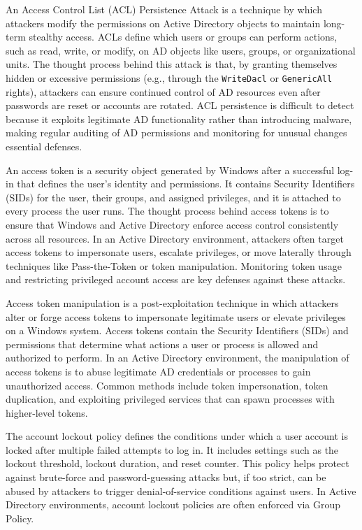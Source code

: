  An Access Control List (ACL) Persistence Attack is a technique by which attackers modify the permissions on Active Directory objects to maintain long-term stealthy access. ACLs define which users or groups can perform actions, such as read, write, or modify, on AD objects like users, groups, or organizational units. The thought process behind this attack is that, by granting themselves hidden or excessive permissions (e.g., through the \verb|WriteDacl| or \verb|GenericAll| rights), attackers can ensure continued control of AD resources even after passwords are reset or accounts are rotated. ACL persistence is difficult to detect because it exploits legitimate AD functionality rather than introducing malware, making regular auditing of AD permissions and monitoring for unusual changes essential defenses.

 An access token is a security object generated by Windows after a successful log-in that defines the user's identity and permissions. It contains Security Identifiers (SIDs) for the user, their groups, and assigned privileges, and it is attached to every process the user runs. The thought process behind access tokens is to ensure that Windows and Active Directory enforce access control consistently across all resources. In an Active Directory environment, attackers often target access tokens to impersonate users, escalate privileges, or move laterally through techniques like Pass-the-Token or token manipulation. Monitoring token usage and restricting privileged account access are key defenses against these attacks.

 Access token manipulation is a post-exploitation technique in which attackers alter or forge access tokens to impersonate legitimate users or elevate privileges on a Windows system. Access tokens contain the Security Identifiers (SIDs) and permissions that determine what actions a user or process is allowed and authorized to perform. In an Active Directory environment, the manipulation of access tokens is to abuse legitimate AD credentials or processes to gain unauthorized access. Common methods include token impersonation, token duplication, and exploiting privileged services that can spawn processes with higher-level tokens.

 The account lockout policy defines the conditions under which a user account is locked after multiple failed attempts to log in. It includes settings such as the lockout threshold, lockout duration, and reset counter. This policy helps protect against brute-force and password-guessing attacks but, if too strict, can be abused by attackers to trigger denial-of-service conditions against users. In Active Directory environments, account lockout policies are often enforced via Group Policy.

